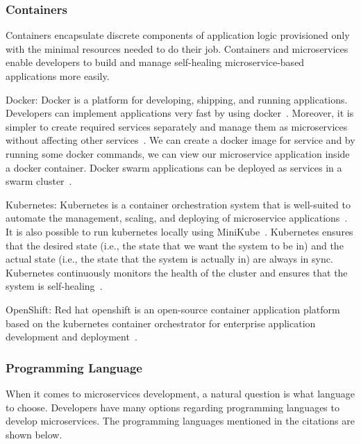 \subsubsection{Containers}
Containers encapsulate discrete components of application logic provisioned only with the minimal resources needed to do their job. Containers and microservices enable developers to build and manage self-healing microservice-based applications more easily.
 
\par Docker: Docker is a platform for developing, shipping, and running applications. Developers can implement applications very fast by using docker~\cite{Sharaf2019, Kristiani2020, khan2020}. Moreover, it is simpler to create required services separately and manage them as microservices without affecting other services~\cite{leo2019, Hou2020, Kalske2017, Bahadori2018}. We can create a docker image for service and by running some docker commands, we can view our microservice application inside a docker container. Docker swarm applications can be deployed as services in a swarm cluster~\cite{Falatiuk2019, Venugopal2017, coulson2020}.
	
\par Kubernetes: Kubernetes is a container orchestration system that is well-suited to automate the management, scaling, and deploying of microservice applications~\cite{Zaytev2018, Kristiani2020, khan2020}. 
It is also possible to run kubernetes locally using MiniKube~\cite{leo2019, Kalske2017}.
Kubernetes ensures that the desired state (i.e., the state that we want the system to be in) and the actual state (i.e., the state that the system is actually in) are always in sync. Kubernetes continuously monitors the health of the cluster and ensures that the system is self-healing~\cite{Bahadori2018, Falatiuk2019, Venugopal2017}.

\par OpenShift: Red hat openshift is an open-source container application platform based on the kubernetes container orchestrator for enterprise application development and deployment~\cite{Johansson2019, Bahadori2018}.


\subsubsection{Programming Language}
When it comes to microservices development, a natural question is what language to choose. Developers have many options regarding programming languages to develop microservices. The programming languages mentioned in the citations are shown below.


